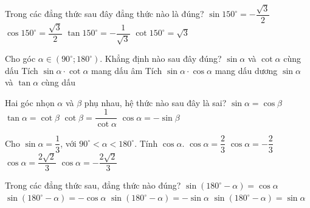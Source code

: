 \begin{ex}%
	Trong các đẳng thức sau đây đẳng thức nào là đúng?
	\choice
	{$\sin 150^{\circ}=-\dfrac{\sqrt{3}}
			{2}$}
	{$\cos 150^{\circ}=\dfrac{\sqrt{3}}
			{2}$}
	{\True $\tan 150^{\circ}=-\dfrac{1}{\sqrt{3}}$}
	{$\cot 150^{\circ}=\sqrt{3}$}
\end{ex}
\begin{ex}%
	Cho góc $\alpha \in \left(90^{\circ};180^{\circ} \right)$. Khẳng định nào sau đây đúng?
	\choice
	{$\sin \alpha$ và $\cot \alpha$ cùng dấu}
	{\True Tích $\sin \alpha \cdot \cot \alpha$ mang dấu âm}
	{Tích $\sin \alpha  \cdot \cos \alpha$ mang dấu dương}
	{$\sin \alpha$ và $\tan \alpha$ cùng dấu}
\end{ex}
\begin{ex}%
	Hai góc nhọn $\alpha$ và $\beta$ phụ nhau, hệ thức nào sau đây là sai?
	\choice
	{$\sin \alpha=\cos \beta$}
	{$\tan \alpha=\cot \beta$}
	{$\cot \beta=\dfrac{1}
			{\cot \alpha}$}
	{\True $\cos \alpha=-\sin \beta$}
\end{ex}
\begin{ex}%
	Cho $\sin \alpha=\dfrac{1}{3}$, với $90^{\circ} < \alpha < 180^{\circ}$. Tính $\cos \alpha$.
	\choice
	{$\cos \alpha=\dfrac{2}
			{3}$}
	{$\cos \alpha=-\dfrac{2}
			{3}$}
	{$\cos \alpha=\dfrac{2\sqrt{2}}{3}$}
	{\True $\cos \alpha=-\dfrac{2\sqrt{2}}{3}$}
\end{ex}
\begin{ex}%
	Trong các đẳng thức sau, đẳng thức nào đúng?
	\choice
	{ $\sin \left(180^\circ-\alpha\right) = \cos \alpha $}
	{ $\sin \left( 180^\circ -\alpha \right) =  - \cos \alpha $}
	{$\sin \left( 180^\circ-\alpha \right) =  - \sin \alpha $}
	{\True $\sin \left( 180^\circ - \alpha  \right) = \sin \alpha $}
\end{ex}
